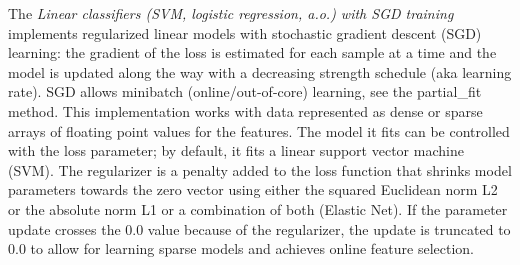 The \textit{Linear classifiers (SVM, logistic regression, a.o.) with SGD
training} implements regularized linear models with stochastic gradient
descent (SGD) learning: the gradient of the loss is estimated for each sample at
a time and the model is updated along the way with a decreasing strength
schedule (aka learning rate).
%
SGD allows minibatch (online/out-of-core) learning, see the partial\_fit method.
%
This implementation works with data represented as dense or sparse arrays of
floating point values for the features.
%
The model it fits can be controlled with the loss parameter; by default, it fits
a linear support vector machine (SVM).
%
The regularizer is a penalty added to the loss function that shrinks model
parameters towards the zero vector using either the squared Euclidean norm L2 or
the absolute norm L1 or a combination of both (Elastic Net).
%
If the parameter update crosses the 0.0 value because of the regularizer, the
update is truncated to 0.0 to allow for learning sparse models and achieves
online feature selection.
%
